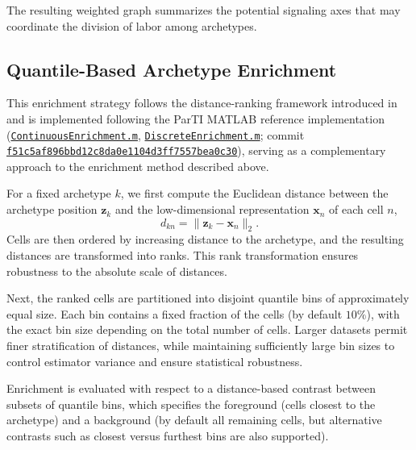 \documentclass{article}
\begin{document}
The resulting weighted graph summarizes the potential signaling axes that may coordinate the division of labor among archetypes.

\subsection{Quantile-Based Archetype Enrichment}

This enrichment strategy follows the distance-ranking framework introduced in \autocite{10.1016/j.cels.2018.12.008,Korem2015,Hart2015} and is implemented following the ParTI MATLAB reference implementation (\href{https://github.com/AlonLabWIS/ParTI/blob/f51c5af896bbd12c8da0e1104d3ff7557bea0c30/ContinuousEnrichment.m}{\texttt{ContinuousEnrichment.m}}, \href{https://github.com/AlonLabWIS/ParTI/blob/f51c5af896bbd12c8da0e1104d3ff7557bea0c30/DiscreteEnrichment.m}{\texttt{DiscreteEnrichment.m}}; commit \href{https://github.com/AlonLabWIS/ParTI/tree/f51c5af896bbd12c8da0e1104d3ff7557bea0c30}{\texttt{f51c5af896bbd12c8da0e1104d3ff7557bea0c30}}), serving as a complementary approach to the enrichment method described above.

For a fixed archetype $k$, we first compute the Euclidean distance between the archetype position $\mathbf{z}_k$ and the low-dimensional representation $\mathbf{x}_n$ of each cell $n$,
\begin{equation}
    d_{kn} = \lVert \mathbf{z}_k - \mathbf{x}_n \rVert_2 .
\end{equation}
Cells are then ordered by increasing distance to the archetype, and the resulting distances are transformed into ranks. This rank transformation ensures robustness to the absolute scale of distances.

Next, the ranked cells are partitioned into disjoint quantile bins of approximately equal size. Each bin contains a fixed fraction of the cells (by default $10\%$), with the exact bin size depending on the total number of cells. Larger datasets permit finer stratification of distances, while maintaining sufficiently large bin sizes to control estimator variance and ensure statistical robustness.

Enrichment is evaluated with respect to a distance-based contrast between subsets of quantile bins, which specifies the foreground (cells closest to the archetype) and a background (by default all remaining cells, but alternative contrasts such as closest versus furthest bins are also supported).
\end{document}

